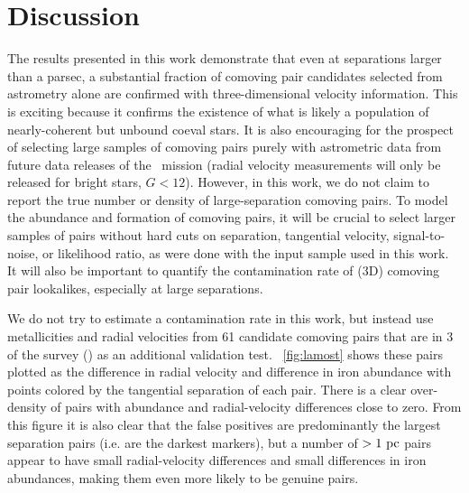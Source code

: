 \documentclass[modern, letterpaper]{aastex61}
\newcommand{\gaia}{\project{Gaia}}
\newcommand{\DR}[1]{\acronym{DR}#1}
\begin{document}
\section{Discussion} \label{sec:discussion}


The results presented in this work demonstrate that even at separations larger
than a parsec, a substantial fraction of comoving pair candidates selected from
astrometry alone are confirmed with three-dimensional velocity information.
This is exciting because it confirms the existence of what is likely a
population of nearly-coherent but unbound coeval stars.
It is also encouraging for the prospect of selecting large samples of comoving
pairs purely with astrometric data from future data releases of the \gaia\
mission (radial velocity measurements will only be released for bright stars, $G
< 12$).
However, in this work, we do not claim to report the true number or density of
large-separation comoving pairs.
To model the abundance and formation of comoving pairs, it will be crucial to
select larger samples of pairs without hard cuts on separation, tangential
velocity, signal-to-noise, or likelihood ratio, as were done with the input
sample used in this work.
It will also be important to quantify the contamination rate of (3D) comoving
pair lookalikes, especially at large separations.

We do not try to estimate a contamination rate in this work, but instead use
metallicities and radial velocities from 61 candidate comoving pairs that are in
\DR{3} of the \acronym{LAMOST} survey (\citealt{Deng:2012}) as an additional
validation test.
\figurename~\ref{fig:lamost} shows these pairs plotted as the difference in
radial velocity and difference in iron abundance with points colored by the
tangential separation of each pair.
There is a clear over-density of pairs with abundance and radial-velocity
differences close to zero.
From this figure it is also clear that the false positives are predominantly the
largest separation pairs (i.e. are the darkest markers), but a number of
$>1~\mathrm{pc}$ pairs appear to have small radial-velocity differences and small
differences in iron abundances, making them even more likely to be genuine
pairs.
\end{document}
